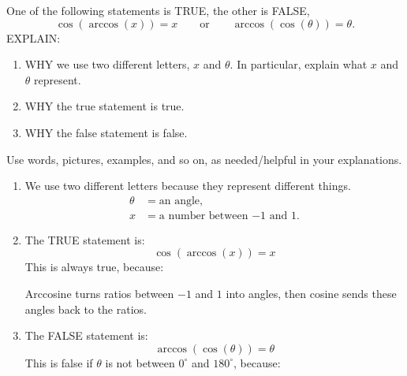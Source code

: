 \documentclass[noauthor,nooutcomes,12pt,handout,hints]{ximera}
\begin{document}
\begin{question}
  One of the following statements is TRUE, the other is FALSE,
  \[
  \cos(\arccos(x)) = x \qquad \text{or} \qquad \arccos(\cos(\theta))
  =\theta.
  \]
  EXPLAIN:
  \begin{enumerate}
  \item WHY we use two different letters, $x$ and $\theta$. In
    particular, explain what $x$ and $\theta$ represent.
  \item WHY the true statement is true.
  \item WHY the false statement is false.
  \end{enumerate}
  Use words, pictures, examples, and so on, as needed/helpful in your
  explanations.
  \begin{freeResponse}
    \begin{enumerate}
    \item We use two different letters because they represent
      different things.
      \begin{align*}
        \theta &= \text{an angle},\\
        x &=\text{a number between $-1$ and $1$}.
      \end{align*}
    \item The TRUE statement is:
      \[
      \cos(\arccos(x)) = x
      \]
      This is always true, because:
      \begin{center}
      \end{center}
      Arccosine turns ratios between $-1$ and $1$ into angles, then
      cosine sends these angles back to the ratios.
    \item The FALSE statement is:
      \[
      \arccos(\cos(\theta)) = \theta
      \]
      This is false if $\theta$ is not between $0^\circ$ and
      $180^\circ$, because:
      \begin{center}
\end{center}
\end{enumerate}
\end{freeResponse}
\end{question}
\end{document}
